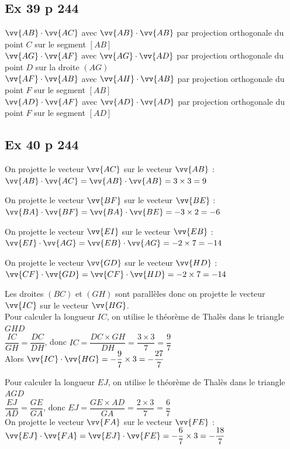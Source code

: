 \documentclass[12pt,a4paper]{book}
\begin{document}
\subsection*{Ex 39 p 244}

$\vv{A B} \cdot \vv{A C}$ avec $\vv{A B} \cdot \vv{A B}$ par projection orthogonale du point $C$ sur le segment $[A B]$\\
$\vv{A G} \cdot \vv{A F}$ avec $\vv{A G} \cdot \vv{A D}$ par projection orthogonale du point $D$ sur la droite $(A G)$\\
$\vv{A F} \cdot \vv{A B}$ avec $\vv{A H} \cdot \vv{A B}$ par projection orthogonale du point $F$ sur le segment $[A B]$\\
$\vv{A D} \cdot \vv{A F}$ avec $\vv{A D} \cdot \vv{A D}$ par projection orthogonale du point $F$ sur le segment $[A D]$

\subsection*{Ex 40 p 244}
\begin{enumMet}
    \item On projette le vecteur $\vv{A C}$ sur le vecteur $\vv{A B}$ :\\
    $\vv{A B} \cdot \vv{A C}=\vv{A B} \cdot \vv{A B}=3 \times 3=9$
    \item On projette le vecteur $\vv{B F}$ sur le vecteur $\vv{B E}$ :\\
    $\vv{B A} \cdot \vv{B F}=\vv{B A} \cdot \vv{B E}=-3 \times 2=-6$
    \item On projette le vecteur $\vv{E I}$ sur le vecteur $\vv{E B}$ :\\
    $\vv{E I} \cdot \vv{A G}=\vv{E B} \cdot \vv{A G}=-2 \times 7=-14$
    \item On projette le vecteur $\vv{G D}$ sur le vecteur $\vv{H D}$ :\\
    $\vv{C F} \cdot \vv{G D}=\vv{C F} \cdot \vv{H D}=-2 \times 7=-14$
    \item Les droites $(B C)$ et $(G H)$ sont parallèles donc on projette le vecteur $\vv{I C}$ sur le vecteur $\vv{H G}$.\\
    Pour calculer la longueur $I C$, on utilise le théorème de Thalès dans le triangle $G H D$\\
    $\dfrac{I C}{G H}=\dfrac{D C}{D H}$, donc $ I C=\dfrac{D C \times G H}{D H}=\dfrac{3 \times 3}{7}=\dfrac{9}{7}$\\
    Alors $\vv{I C} \cdot \vv{H G}=-\dfrac{9}{7} \times 3=-\dfrac{27}{7}$
    \item Pour calculer la longueur $E J$, on utilise le théorème de Thalès dans le triangle $A G D$\\
    $\dfrac{E J}{A D}=\dfrac{G E}{G A}$, donc $ E J=\dfrac{G E \times A D}{G A}=\dfrac{2 \times 3}{7}=\dfrac{6}{7}$\\
    On projette le vecteur $\vv{F A}$ sur le vecteur $\vv{F E}$ :\\
    $\vv{E J} \cdot \vv{F A}=\vv{E J} \cdot \vv{F E}=-\dfrac{6}{7} \times 3=-\dfrac{18}{7}$
\end{enumMet}
\end{document}
